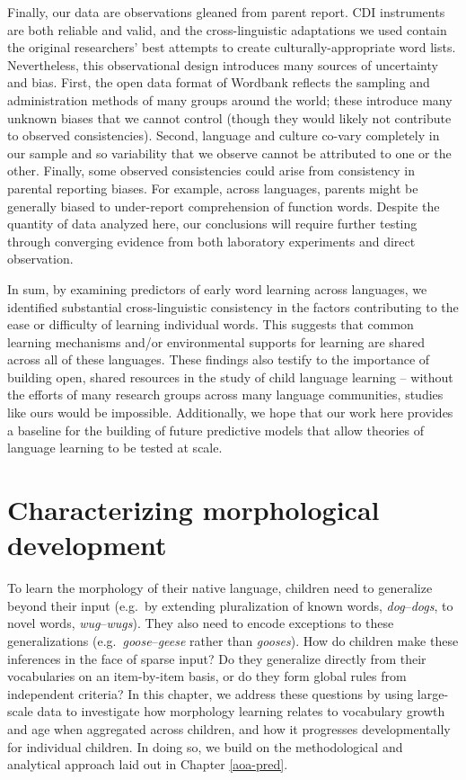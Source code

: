 \documentclass[
   11pt,
       ]{book}
\begin{document}
Finally, our data are observations gleaned from parent report. CDI instruments are both reliable and valid, and the cross-linguistic adaptations we used contain the original researchers' best attempts to create culturally-appropriate word lists. Nevertheless, this observational design introduces many sources of uncertainty and bias. First, the open data format of Wordbank reflects the sampling and administration methods of many groups around the world; these introduce many unknown biases that we cannot control (though they would likely not contribute to observed consistencies). Second, language and culture co-vary completely in our sample and so variability that we observe cannot be attributed to one or the other. Finally, some observed consistencies could arise from consistency in parental reporting biases. For example, across languages, parents might be generally biased to under-report comprehension of function words. Despite the quantity of data analyzed here, our conclusions will require further testing through converging evidence from both laboratory experiments and direct observation.

In sum, by examining predictors of early word learning across languages, we identified substantial cross-linguistic consistency in the factors contributing to the ease or difficulty of learning individual words. This suggests that common learning mechanisms and/or environmental supports for learning are shared across all of these languages. These findings also testify to the importance of building open, shared resources in the study of child language learning -- without the efforts of many research groups across many language communities, studies like ours would be impossible. Additionally, we hope that our work here provides a baseline for the building of future predictive models that allow theories of language learning to be tested at scale.

\hypertarget{cdi-overreg}{%
\chapter{Characterizing morphological development}\label{cdi-overreg}}

To learn the morphology of their native language, children need to generalize beyond their input (e.g.~by extending pluralization of known words, \emph{dog}--\emph{dogs}, to novel words, \emph{wug}--\emph{wugs}). They also need to encode exceptions to these generalizations (e.g.~\emph{goose}--\emph{geese} rather than \emph{gooses}). How do children make these inferences in the face of sparse input? Do they generalize directly from their vocabularies on an item-by-item basis, or do they form global rules from independent criteria? In this chapter, we address these questions by using large-scale data to investigate how morphology learning relates to vocabulary growth and age when aggregated across children, and how it progresses developmentally for individual children. In doing so, we build on the methodological and analytical approach laid out in Chapter \ref{aoa-pred}.
\end{document}
